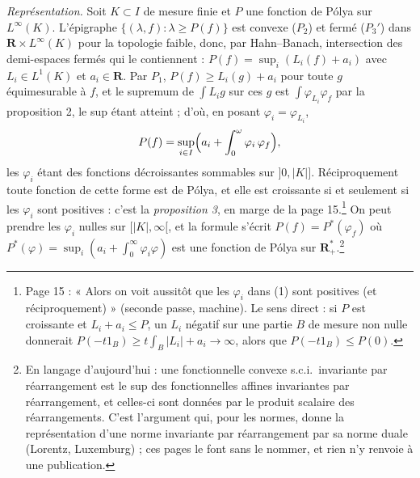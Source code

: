 \documentclass[11pt,a4paper]{article}
\begin{document}
\emph{Représentation.} Soit $K \subset I$ de mesure finie et $P$ une fonction
de Pólya sur $L^\infty(K)$. L'épigraphe $\{(\lambda, f) : \lambda \geq P(f)\}$
est convexe ($P_2$) et fermé ($P_3'$) dans $\mathbf{R} \times L^\infty(K)$
pour la topologie faible, donc, par Hahn--Banach, intersection des
demi-espaces fermés qui le contiennent : $P(f) = \sup_i (L_i(f) + a_i)$ avec
$L_i \in L^1(K)$ et $a_i \in \mathbf{R}$. Par $P_1$, $P(f) \geq L_i(g) + a_i$
pour toute $g$ équimesurable à $f$, et le supremum de $\int L_i g$ sur ces
$g$ est $\int \varphi_{L_i}\varphi_f$ par la proposition 2, le
sup étant atteint ; d'où, en posant $\varphi_i = \varphi_{L_i}$,
\[
  P(f) = \sup_{i \in I}\Bigl( a_i + \int_0^{\omega} \varphi_i\,\varphi_f \Bigr),
\]
les $\varphi_i$ étant des fonctions décroissantes sommables sur $]0, |K|]$.
Réciproquement toute fonction de cette forme est de Pólya, et elle est
croissante si et seulement si les $\varphi_i$ sont positives : c'est la
\emph{proposition 3}, en marge de la page 15.\footnote{Page 15 : « Alors on
voit aussitôt que les $\varphi_i$ dans (1) sont positives (et
réciproquement) » (seconde passe, machine). Le sens direct : si $P$ est
croissante et $L_i + a_i \leq P$, un $L_i$ négatif sur une partie $B$ de
mesure non nulle donnerait $P(-t1_B) \geq t\int_B |L_i| + a_i \to \infty$,
alors que $P(-t1_B) \leq P(0)$.} On peut prendre les $\varphi_i$
nulles sur $[|K|, \infty[$, et la formule s'écrit $P(f) = P^{*}(\varphi_f)$ où
$P^{*}(\varphi) = \sup_i (a_i + \int_0^\infty \varphi_i\varphi)$ est une
fonction de Pólya sur $\mathbf{R}^{*}_{+}$.\footnote{En langage
d'aujourd'hui : une fonctionnelle convexe s.c.i.\ invariante par
réarrangement est le sup des fonctionnelles affines invariantes par
réarrangement, et celles-ci sont données par le produit scalaire des
réarrangements. C'est l'argument qui, pour les normes, donne la
représentation d'une norme invariante par réarrangement par sa norme duale
(Lorentz, Luxemburg) ; ces pages le font sans le nommer, et rien n'y renvoie
à une publication.}
\end{document}

